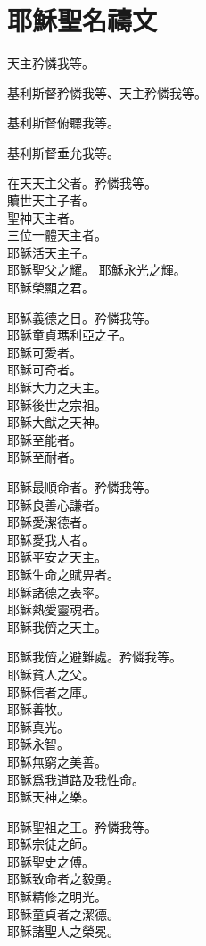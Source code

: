 \section{耶穌聖名禱文}
\versicle 天主矜憐我等。

\Response 基利斯督矜憐我等、\hfill 天主矜憐我等。

\versicle 基利斯督俯聽我等。

\Response 基利斯督垂允我等。

\versicle  在天天主父者。\hfill \response 矜憐我等。\\
贖世天主子者。\\
聖神天主者。\\
三位一體天主者。\\
耶穌活天主子。\\
耶穌聖父之耀。
耶穌永光之輝。\\
耶穌榮顯之君。

\versicle 耶穌義德之日。\hfill \response 矜憐我等。\\
耶穌童貞瑪利亞之子。\\
耶穌可愛者。\\
耶穌可奇者。\\
耶穌大力之天主。\\
耶穌後世之宗祖。\\
耶穌大猷之天神。\\
耶穌至能者。\\
耶穌至耐者。

\versicle 耶穌最順命者。\hfill \response 矜憐我等。\\
耶穌良善心謙者。\\
耶穌愛潔德者。\\
耶穌愛我人者。\\
耶穌平安之天主。\\
耶穌生命之賦畀者。\\
耶穌諸德之表率。\\
耶穌熱愛靈魂者。\\
耶穌我儕之天主。

\versicle 耶穌我儕之避難處。\hfill \response 矜憐我等。\\
耶穌貧人之父。\\ 
耶穌信者之庫。\\
耶穌善牧。\\
耶穌真光。\\
耶穌永智。\\
耶穌無窮之美善。\\
耶穌爲我道路及我性命。\\
耶穌天神之樂。

\versicle 耶穌聖祖之王。\hfill \response 矜憐我等。\\
耶穌宗徒之師。\\
耶穌聖史之傅。\\
耶穌致命者之毅勇。\\
耶穌精修之明光。\\
耶穌童貞者之潔德。\\
耶穌諸聖人之榮冕。

